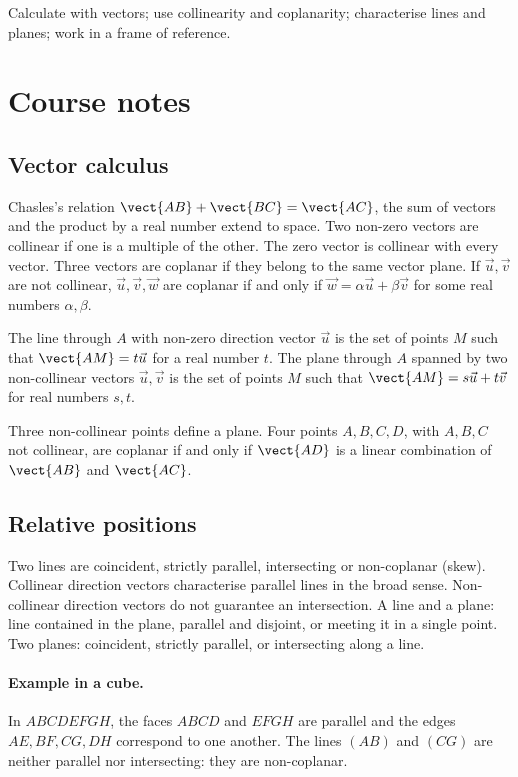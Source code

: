 \label{ch:10}


\begin{keypoint}[Objectives]Calculate with vectors; use collinearity and coplanarity; characterise lines and planes; work in a frame of reference.\end{keypoint}

\section{Course notes}
\subsection{Vector calculus}
Chasles's relation $\vect{AB}+\vect{BC}=\vect{AC}$, the sum of vectors and the product by a real number extend to space. Two non-zero vectors are collinear if one is a multiple of the other. The zero vector is collinear with every vector.
Three vectors are coplanar if they belong to the same vector plane. If $\vec u,\vec v$ are not collinear, $\vec u,\vec v,\vec w$ are coplanar if and only if $\vec w=\alpha\vec u+\beta\vec v$ for some real numbers $\alpha,\beta$.
\begin{keypoint}
The line through $A$ with non-zero direction vector $\vec u$ is the set of points $M$ such that $\vect{AM}=t\vec u$ for a real number $t$.
The plane through $A$ spanned by two non-collinear vectors $\vec u,\vec v$ is the set of points $M$ such that $\vect{AM}=s\vec u+t\vec v$ for real numbers $s,t$.
\end{keypoint}
Three non-collinear points define a plane. Four points $A,B,C,D$, with $A,B,C$ not collinear, are coplanar if and only if $\vect{AD}$ is a linear combination of $\vect{AB}$ and $\vect{AC}$.
\subsection{Relative positions}
Two lines are coincident, strictly parallel, intersecting or non-coplanar (skew). Collinear direction vectors characterise parallel lines in the broad sense. Non-collinear direction vectors do not guarantee an intersection.
A line and a plane: line contained in the plane, parallel and disjoint, or meeting it in a single point. Two planes: coincident, strictly parallel, or intersecting along a line.
\paragraph{Example in a cube.} In $ABCDEFGH$, the faces $ABCD$ and $EFGH$ are parallel and the edges $AE,BF,CG,DH$ correspond to one another. The lines $(AB)$ and $(CG)$ are neither parallel nor intersecting: they are non-coplanar.
